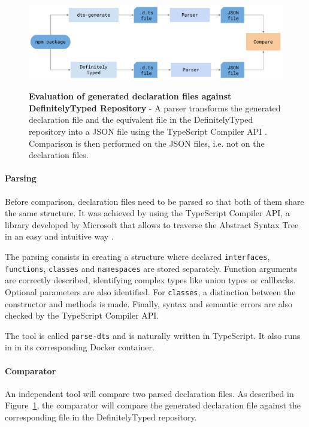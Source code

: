 \documentclass[a4paper,english,cleveref, autoref]{lipics-v2019}
\newcommand{\figref}[1]{Figure~\ref{#1}}
\begin{document}
\begin{figure}[tp]
    \begin{centering}
        {\includegraphics[width=1\textwidth]{evaluation-diagram.pdf}}
        \caption[Evaluation against DefinitelyTyped Repository]{\textbf{Evaluation of generated declaration files against DefinitelyTyped Repository} - A parser transforms the generated declaration file and the equivalent file in the DefinitelyTyped repository into a JSON file using the TypeScript Compiler API \cite{typescript-compiler-api}. Comparison is then performed on the JSON files, i.e. not on the declaration files.}
        \label{fig:evaluation-diagram}
    \end{centering}
\end{figure}

\paragraph*{Parsing}
Before comparison, declaration files need to be parsed so that both of them share the same structure. It was achieved by using the TypeScript Compiler API, a library developed by Microsoft that allows to traverse the Abstract Syntax Tree in an easy and intuitive way \cite{typescript-compiler-api}.

The parsing consists in creating a structure where declared \lstinline{interfaces}, \lstinline{functions}, \lstinline{classes} and \lstinline{namespaces} are stored separately. Function arguments are correctly described, identifying complex types like union types or callbacks. Optional parameters are also identified. For \lstinline{classes}, a distinction between the constructor and methods is made. Finally, syntax and semantic errors are also checked by the TypeScript Compiler API.

The tool is called \texttt{parse-dts} and is naturally written in TypeScript. It also runs in \NodeJS{} in its corresponding Docker container.

\paragraph*{Comparator}
An independent tool will compare two parsed declaration files. As described in \figref{fig:evaluation-diagram}, the comparator will compare the generated declaration file against the corresponding file in the DefinitelyTyped repository.
\end{document}
